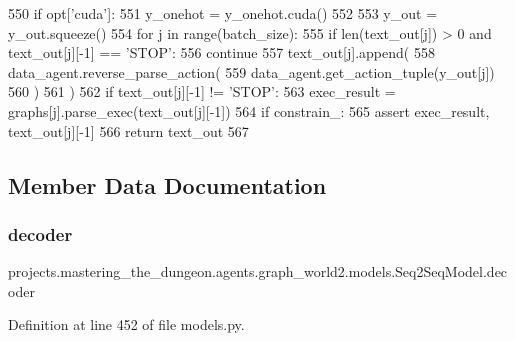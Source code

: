 \begin{DoxyCode}
550             \textcolor{keywordflow}{if} opt[\textcolor{stringliteral}{'cuda'}]:
551                 y\_onehot = y\_onehot.cuda()
552 
553             y\_out = y\_out.squeeze()
554             \textcolor{keywordflow}{for} j \textcolor{keywordflow}{in} range(batch\_size):
555                 \textcolor{keywordflow}{if} len(text\_out[j]) > 0 \textcolor{keywordflow}{and} text\_out[j][-1] == \textcolor{stringliteral}{'STOP'}:
556                     \textcolor{keywordflow}{continue}
557                 text\_out[j].append(
558                     data\_agent.reverse\_parse\_action(
559                         data\_agent.get\_action\_tuple(y\_out[j])
560                     )
561                 )
562                 \textcolor{keywordflow}{if} text\_out[j][-1] != \textcolor{stringliteral}{'STOP'}:
563                     exec\_result = graphs[j].parse\_exec(text\_out[j][-1])
564                     \textcolor{keywordflow}{if} constrain\_:
565                         \textcolor{keyword}{assert} exec\_result, text\_out[j][-1]
566         \textcolor{keywordflow}{return} text\_out
567 \end{DoxyCode}


\subsection{Member Data Documentation}
\mbox{\label{classprojects_1_1mastering__the__dungeon_1_1agents_1_1graph__world2_1_1models_1_1Seq2SeqModel_a280544522d6374654857aa5d0a602fe3}} 
\subsubsection{\texorpdfstring{decoder}{decoder}}
{\footnotesize\ttfamily projects.\+mastering\+\_\+the\+\_\+dungeon.\+agents.\+graph\+\_\+world2.\+models.\+Seq2\+Seq\+Model.\+decoder}



Definition at line 452 of file models.\+py.


